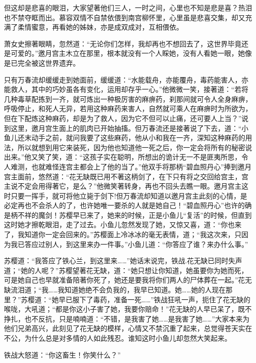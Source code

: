 \documentclass[12pt,oneside]{book}
\begin{document}
但这却是悲喜的眼泪，大家望著他们三人，一时之间，心里也不知是悲是喜？热泪也不禁夺眶而出。慕容双情不自禁依偎到南宫柳怀里，心里虽是悲喜交集，却又充满了柔情蜜意，再看她的姊妹，亦是成双成对，互相偎依。

萧女史擦著眼睛，忽然道：``无论你们怎样，我却再也不想回去了，这世界毕竟还是可爱的。''邀月宫主木立在那里，根本就没有一个人睬她，没有人看她一眼，她像是已完全被这世界遗弃。

只有万春流却缓缓走到她面前，缓缓道：``水能载舟，亦能覆舟，毒药能害人，亦能救人，其中的巧妙虽各有变化，运用却存乎一心。''他微微一笑，接著道：``若将几种毒草配拣到一齐，就可炼出一种极厉害的麻痹药，刹那间就可令人全身麻痹，呼吸停止，和死人无异，若用这种麻药来害人，自然就可乘人在麻痹时为所欲为，但在下配炼这种麻药，却是为了救人，因为它不但可以止痛，还可要人上当？''说到这里，邀月宫生面上的肌肉已开始抽搐。但万春流还是接著说了下去，道：``小鱼儿还末动手之前，就问我要了这些麻药，他从小和我在一齐，深知这种麻药的用法，所以就想到用它来装死，因为他也知道他一死之后，你一定会将所有的秘密说出来。''他又笑了笑，道：``这孩子实在聪明，所想出的诡计无一不是匪夷所思，令人难测，也就难怪连宫主都会上了他的当了。''他双手将那柄``碧血照丹心''捧到邀月宫主面前，悠然道：``花无缺既已用不著这柄剑了，在下只有将之交回给宫主，宫主说不定会用得著它，是么？''他微笑著转身，再也不回头去瞧一眼。邀月宫主这时只要一挥手，就可将他立毙于剑下!但万春流却知道以邀月宫主此刻的心情，是必定再也不会杀人的了，也许她唯一要杀的人就是她自己！``碧血照丹心''也许的确是柄不祥的魔剑！苏樱早已来了，她来的时候，正是小鱼儿``复活''的时候，但直到这时她才擦乾眼泪，走了过去。小鱼儿忽然发现了她，又惊又喜，道：``你也来了，我知道你一定会回来的。''苏樱面上冷冰冰的毫无表情，道；``我这次来，只因为我已答应过别人，到这里来办一件事。''小鱼儿道：``你答应了谁？来办什么事。''

苏樱道：``我答应了铁心兰，到这里来\ldots\ldots{}''她话末说完，铁战.花无缺已同时失声道；``她的人呢？''苏樱望著花无缺，道：``她只想让你知道，她虽要你为她而死，可是她自己也早就准备陪著你死了，她还是要我将你们两人的尸体葬在一起。''花无缺流泪道；``我\ldots\ldots 我知道她绝不会负我的，我早已知道。她\ldots\ldots 她的人现在那里？''苏樱道：``她早已服下了毒药，准备一死\ldots\ldots{}''铁战狂吼一声，扼住了花无缺的喉咙，大吼道；``都是你这小子害了她，我要你赔命！''花无缺的人早已呆了，既不挣扎，也不反抗，只是喃喃道：``不错，是我害了她\ldots\ldots 是我害了她\ldots\ldots{}''大家本来为他们兄弟高兴，此刻见了花无缺的模样，心情又不禁沉重了起来，总觉得苍天实在不公，为什么总是对多情的人如此残忍。谁知这时小鱼儿却忽然大笑起来。

铁战大怒道：``你这畜生！你笑什么？''
\end{document}
